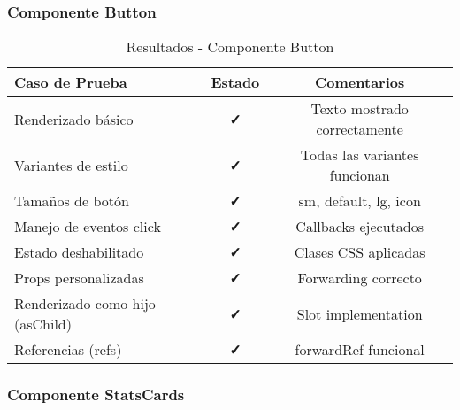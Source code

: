 \documentclass[12pt,a4paper]{article}
\begin{document}
\subsubsection{Componente Button}

\begin{table}[H]
\centering
\caption{Resultados - Componente Button}
\begin{tabular}{@{}p{6cm}cc@{}}
\toprule
\textbf{Caso de Prueba} & \textbf{Estado} & \textbf{Comentarios} \\
\midrule
Renderizado básico & \textcolor{successgreen}{\textbf{✓}} & Texto mostrado correctamente \\
Variantes de estilo & \textcolor{successgreen}{\textbf{✓}} & Todas las variantes funcionan \\
Tamaños de botón & \textcolor{successgreen}{\textbf{✓}} & sm, default, lg, icon \\
Manejo de eventos click & \textcolor{successgreen}{\textbf{✓}} & Callbacks ejecutados \\
Estado deshabilitado & \textcolor{successgreen}{\textbf{✓}} & Clases CSS aplicadas \\
Props personalizadas & \textcolor{successgreen}{\textbf{✓}} & Forwarding correcto \\
Renderizado como hijo (asChild) & \textcolor{successgreen}{\textbf{✓}} & Slot implementation \\
Referencias (refs) & \textcolor{successgreen}{\textbf{✓}} & forwardRef funcional \\
\bottomrule
\end{tabular}
\end{table}

\subsubsection{Componente StatsCards}
\end{document}
